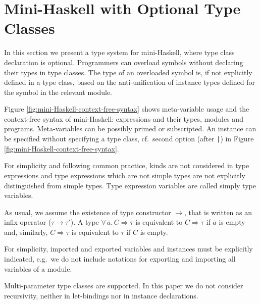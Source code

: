 \section{Mini-Haskell with Optional Type Classes}
\label{Optional-type-classes}

In this section we present a type system for mini-Haskell, where type
class declaration is optional. Programmers can overload symbols
without declaring their types in type classes. The type of an
overloaded symbol is, if not explicitly defined in a type class, based
on the anti-unification of instance types defined for the symbol in
the relevant module.

Figure \ref{fig:mini-Haskell-context-free-syntax} shows meta-variable
usage and the context-free syntax of mini-Haskell: expressions and
their types, modules and programs. Meta-variables can be possibly
primed or subscripted. An instance can be specified without specifying
a type class, cf.~second option (after {\tt |}) in Figure
\ref{fig:mini-Haskell-context-free-syntax}.


For simplicity and following common practice, kinds are not considered
in type expressions and type expressions which are not simple types
are not explicitly distinguished from simple types. Type expression
variables are called simply type variables. 

As usual, we assume the existence of type constructor $\to$, that is
written as an infix operator ($\tau \to \tau'$). A type
$\forall\,\overline{a}.\,C\Rightarrow \tau$ is equivalent to
$C\Rightarrow \tau$ if $\overline{a}$ is empty and, similarly,
$C\Rightarrow \tau$ is equivalent to $\tau$ if $C$ is empty.

For simplicity, imported and exported variables and instances must be
explicitly indicated, e.g.~we do not include notations for exporting
and importing all variables of a module.

Multi-parameter type classes are supported. In this paper we do not
consider recursivity, neither in let-bindings nor in instance
declarations. 

